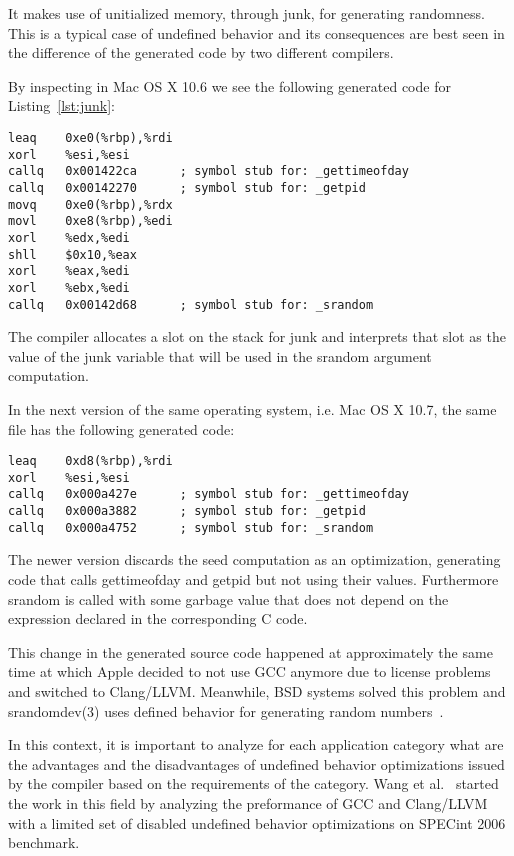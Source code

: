 It makes use of unitialized memory, through junk, for generating
randomness. This is a typical case of undefined behavior and its
consequences are best seen in the difference of the generated code by
two different compilers.

By inspecting  in Mac OS X 10.6 we see
the following generated code for Listing~\ref{lst:junk}:
\begin{lstlisting}[style=Cstyle, caption={}, label={}]
leaq    0xe0(%rbp),%rdi
xorl    %esi,%esi
callq   0x001422ca      ; symbol stub for: _gettimeofday
callq   0x00142270      ; symbol stub for: _getpid
movq    0xe0(%rbp),%rdx
movl    0xe8(%rbp),%edi
xorl    %edx,%edi
shll    $0x10,%eax
xorl    %eax,%edi
xorl    %ebx,%edi
callq   0x00142d68      ; symbol stub for: _srandom
\end{lstlisting}

The compiler allocates a slot on the stack for junk and interprets that
slot as the value of the junk variable that will be used in the srandom
argument computation. 

In the next version of the same operating system, i.e. Mac OS X 10.7,
the same file has the following generated code:
\begin{lstlisting}[style=Cstyle, caption={}, label={}]
leaq    0xd8(%rbp),%rdi
xorl    %esi,%esi
callq   0x000a427e      ; symbol stub for: _gettimeofday
callq   0x000a3882      ; symbol stub for: _getpid
callq   0x000a4752      ; symbol stub for: _srandom
\end{lstlisting}

The newer version discards the seed computation as an optimization,
generating code that calls gettimeofday and getpid but not using their
values. Furthermore srandom is called with some garbage value that does
not depend on the expression declared in the corresponding C code.

This change in the generated source code happened at approximately the
same time at which Apple decided to not use GCC anymore due to license
problems and switched to Clang/LLVM. Meanwhile, BSD systems solved this
problem and srandomdev(3) uses defined behavior for generating random
numbers~\cite{junkobsd,junkfbsd,junkdbsd}.

In this context, it is important to analyze for each application
category what are the advantages and the disadvantages of undefined
behavior optimizations issued by the compiler based on the requirements
of the category. Wang et al.~\cite{wang2012undefined} started the work
in this field by analyzing the preformance of GCC and Clang/LLVM with a
limited set of disabled undefined behavior optimizations on SPECint 2006
benchmark.

